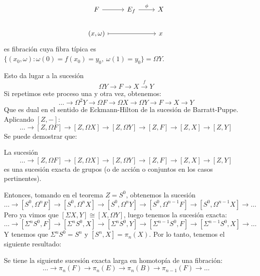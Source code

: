 \[
\begin{tikzcd}
F \rar & E_f \rar{\phi} & X \\
(x, \omega) \arrow[mapsto]{rr} & & x
\end{tikzcd}
\]
es fibración cuya fibra típica es $\{(x_0, \omega) : \omega(0) = f(x_0) = y_0, \ \omega(1) = y_0 \} = \Omega Y$. \par
Esto da lugar a la sucesión
\[ \Omega Y \longrightarrow F \longrightarrow X \stackrel{f}{\longrightarrow} Y \]
Si repetimos este proceso una y otra vez, obtenemos:
\[ \dots \longrightarrow \Omega^2 Y \longrightarrow \Omega F \longrightarrow \Omega X \longrightarrow \Omega Y \longrightarrow F \longrightarrow X \longrightarrow Y \]
Que es dual en el sentido de Eckmann-Hilton de la sucesión de Barratt-Puppe. Aplicando $[Z,-]$: 
\[ \dots  \longrightarrow [Z,\Omega F] \longrightarrow [Z, \Omega X] \longrightarrow [Z,\Omega Y] \longrightarrow [Z, F] \longrightarrow [Z, X] \longrightarrow [Z, Y] \]
Se puede demostrar que:
\begin{teor}
La sucesión
\[ \dots  \longrightarrow [Z,\Omega F] \longrightarrow [Z, \Omega X] \longrightarrow [Z,\Omega Y] \longrightarrow [Z, F] \longrightarrow [Z, X] \longrightarrow [Z, Y] \]
es una sucesión exacta de grupos (o de acción o conjuntos en los casos pertinentes).
\end{teor}
Entonces, tomando en el teorema $Z = S^0$, obtenemos la sucesión
\[ \dots  \longrightarrow [S^0,\Omega^n F] \longrightarrow [S^0, \Omega^n X] \longrightarrow [S^0,\Omega^n Y] \longrightarrow [S^0, \Omega^{n-1} F] \longrightarrow [S^0, \Omega^{n-1} X] \longrightarrow \dots \]
Pero ya vimos que $[\Sigma X, Y] \cong [X, \Omega Y]$, luego tenemos la sucesión exacta:
\[ \dots  \longrightarrow [\Sigma^n S^0, F] \longrightarrow [\Sigma^n S^0,  X] \longrightarrow [\Sigma^n S^0, Y] \longrightarrow [\Sigma^{n-1} S^0, F] \longrightarrow [\Sigma^{n-1}S^0,  X] \longrightarrow \dots \]
Y tenemos que $\Sigma^n S^0 = S^n$ y $[S^n, X] = \pi_n(X)$. Por lo tanto, tenemos el siguiente resultado:
\begin{teor}
Se tiene la siguiente sucesión exacta larga en homotopía de una fibración:
\[
\dots \longrightarrow \pi_n (F) \longrightarrow \pi_n (E) \longrightarrow \pi_n (B) \longrightarrow \pi_{n-1} (F) \longrightarrow \dots 
\]
\end{teor}